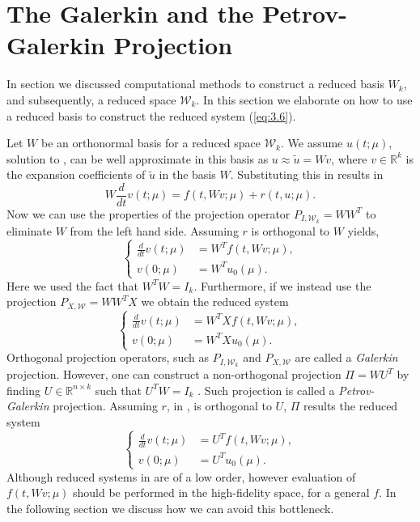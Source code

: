 \section{The Galerkin and the Petrov-Galerkin Projection} In section  we discussed computational methods to construct a reduced basis $W_k$, and subsequently, a reduced space $\mathcal W_k$. In this section we elaborate on how to use a reduced basis to construct the reduced system (\ref{eq:3.6}).

Let $W$ be an orthonormal basis for a reduced space $\mathcal W_k$. We assume $u(t;\mu)$, solution to , can be well approximate in this basis as $u \approx \tilde u = W v$, where $v\in \mathbb R^{k}$ is the expansion coefficients of $\tilde u$ in the basis $W$. Substituting this in 
 results in
\begin{equation} \label{eq:3.25}
	W \frac{d}{dt} v(t;\mu) = f(t,Wv;\mu) + r(t,u;\mu).
\end{equation}
Now we can use the properties of the projection operator $P_{I,\mathcal W_k} = WW^T$ to eliminate $W$ from the left hand side. Assuming $r$ is orthogonal to $W$ yields,
\begin{equation} \label{eq:3.26}
	\left\{
	\begin{aligned}
	\frac{d}{dt} v(t;\mu) &= W^T f(t,Wv;\mu), \\
	v(0;\mu) &= W^T u_0(\mu).
	\end{aligned}
	\right.
\end{equation}
Here we used the fact that $W^TW = I_k$. Furthermore, if we instead use the projection $P_{X,\mathcal W} = WW^TX$ we obtain the reduced system
\begin{equation} \label{eq:3.27}
	\left\{
	\begin{aligned}
	\frac{d}{dt} v(t;\mu) &= W^T X f(t,Wv;\mu), \\
	v(0;\mu) &= W^T X u_0(\mu).
	\end{aligned}
	\right.
\end{equation}
Orthogonal projection operators, such as $P_{I,\mathcal W_k}$ and $P_{X,\mathcal W}$ are called a \emph{Galerkin} projection. However, one can construct a non-orthogonal projection $\Pi = WU^T$ by finding $U\in \mathbb R^{n\times k}$ such that $U^TW = I_k$ \cite{hesthaven2015certified,quarteroni2015reduced,doi:10.1137/1.9780898718713}. Such projection is called a \emph{Petrov-Galerkin} projection. Assuming $r$, in , is orthogonal to $U$, $\Pi$ results the reduced system
\begin{equation} \label{eq:3.28}
	\left\{
	\begin{aligned}
	\frac{d}{dt} v(t;\mu) &= U^T f(t,Wv;\mu), \\
	v(0;\mu) &= U^T u_0(\mu).
	\end{aligned}
	\right.
\end{equation} 
Although reduced systems in  are of a low order, however evaluation of $f(t,Wv;\mu)$ should be performed in the high-fidelity space, for a general $f$. In the following section we discuss how we can avoid this bottleneck. 

